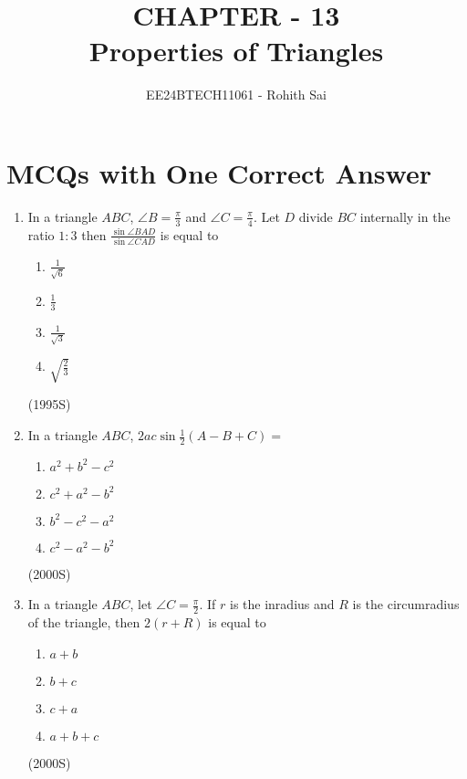 \documentclass[journal,12pt,twocolumn]{IEEEtran}
\theoremstyle{remark}
\begin{document}

\vspace{3cm}

\title{CHAPTER - 13\\Properties of Triangles}
\author{EE24BTECH11061 - Rohith Sai}
\maketitle
\newpage
\bigskip

\renewcommand{\thefigure}{\theenumi}
\renewcommand{\thetable}{\theenumi}

\section{MCQs with One Correct Answer}

\begin{enumerate}
\item In a triangle $ABC$, $\angle B = \frac{\pi}{3}$ and $\angle C = \frac{\pi}{4}$. Let $D$ divide $BC$ internally in the ratio $1:3$ then $\frac{\sin\angle BAD}{\sin \angle CAD}$ is equal to
\begin{enumerate}[label = (\alph*)]
\item $\frac{1}{\sqrt6}$
\item $\frac{1}{3}$
\item $\frac{1}{\sqrt3}$
\item $\sqrt{\frac{2}{3}}$
\end{enumerate}
\hfill {(1995S)}\\

\item In a triangle $ABC$, $2ac\sin\frac{1}{2}(A-B+C) = $
\begin{enumerate}[label = (\alph*)]
\item $a^2 + b^2 - c^2$
\item $c^2 + a^2 - b^2$
\item $b^2 - c^2 - a^2$
\item $c^2 - a^2 - b^2$
\end{enumerate}
\hfill {(2000S)}\\

\item In a triangle $ABC$, let $\angle C = \frac{\pi}{2}$. If $r$ is the inradius and $R$ is the circumradius of the triangle, then $2(r+R)$ is equal to
\begin{enumerate}[label = (\alph*)]
\item $a+b$
\item $b+c$
\item $c+a$
\item $a+b+c$
\end{enumerate}
\hfill (2000S)\\


\end{enumerate}
\end{document}
